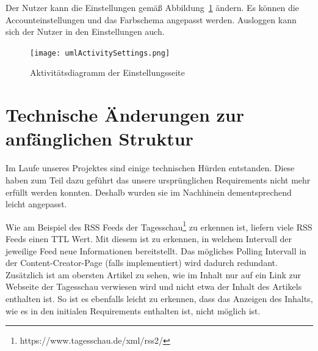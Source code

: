 Der Nutzer kann die Einstellungen gemäß Abbildung~\ref{fig:umlActivitySettings.png} ändern.
Es können die Accounteinstellungen und das Farbschema angepasst werden.
Ausloggen kann sich der Nutzer in den Einstellungen auch.
\begin{figure}
    \texttt{[image: umlActivitySettings.png]}
    \caption{Aktivitätsdiagramm der Einstellungsseite}
    \label{fig:umlActivitySettings.png}
\end{figure}


\section{Technische Änderungen zur anfänglichen Struktur} \label{tech_changes}
Im Laufe unseres Projektes sind einige technischen Hürden entstanden. Diese haben zum Teil dazu geführt das unsere ursprünglichen Requirements nicht mehr erfüllt werden konnten.
Deshalb wurden sie im Nachhinein dementsprechend leicht angepasst.

\begin{table}[h]
\caption{Tabelle – Änderungen zur anfänglichen Struktur}
\end{table}

Wie am Beispiel des RSS Feeds der Tagesschau\footnote{https://www.tagesschau.de/xml/rss2/} zu erkennen ist, liefern viele RSS Feeds einen TTL Wert.
Mit diesem ist zu erkennen, in welchem Intervall der jeweilige Feed neue Informationen bereitstellt. Das mögliches Polling Intervall in der Content-Creator-Page (falls implementiert) wird dadurch redundant.
Zusätzlich ist am obersten Artikel zu sehen, wie im Inhalt nur auf ein Link zur Webseite der Tagesschau verwiesen wird und nicht etwa der Inhalt des Artikels enthalten ist.
So ist es ebenfalls leicht zu erkennen, dass das Anzeigen des Inhalts, wie es in den initialen Requirements enthalten ist, nicht möglich ist.

